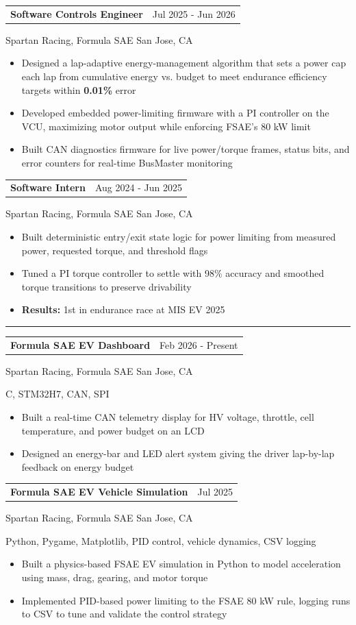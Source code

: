 \documentclass[10pt,letterpaper]{article}
\makeatletter
\newcommand{\sectionheader}[1]{%
  \vspace{4pt}
  \noindent\rule{\textwidth}{0.35pt}\par
  \vspace{4pt}
  \noindent{\fontsize{12.5}{13.5}\selectfont\textbf{#1}}\par
  \vspace{3pt}
}
\newcommand{\roleline}[2]{%
  \noindent
  \begin{tabular*}{\textwidth}{@{\extracolsep{\fill}} l r}
    \textbf{#1} & #2 \\
  \end{tabular*}
  \vspace{-2pt}
}
\newcommand{\orgline}[1]{%
  #1\par
  \vspace{1pt}
}
\newcommand{\techline}[1]{%
  #1\par
  \vspace{1pt}
}
\newcommand{\entryspace}{\vspace{2pt}}
\makeatother
\begin{document}
\roleline{Software Controls Engineer}{Jul 2025 - Jun 2026}
\orgline{Spartan Racing, Formula SAE\textbar{} San Jose, CA}
\begin{itemize}
  \item Designed a lap-adaptive energy-management algorithm that sets a power cap each lap from cumulative energy vs. budget to meet endurance efficiency targets within \textbf{0.01\%} error
  \item Developed embedded power-limiting firmware with a PI controller on the VCU, maximizing motor output while enforcing FSAE's 80 kW limit
  \item Built CAN diagnostics firmware for live power/torque frames, status bits, and error counters for real-time BusMaster monitoring
\end{itemize}

\entryspace

\roleline{Software Intern}{Aug 2024 - Jun 2025}
\orgline{Spartan Racing, Formula SAE\textbar{} San Jose, CA}
\begin{itemize}
  \item Built deterministic entry/exit state logic for power limiting from measured power, requested torque, and threshold flags
  \item Tuned a PI torque controller to settle with 98\% accuracy and smoothed torque transitions to preserve drivability
  \item \textbf{Results:} 1st in endurance race at MIS EV 2025
\end{itemize}

\sectionheader{PROJECT EXPERIENCE}

\roleline{Formula SAE EV Dashboard}{Feb 2026 - Present}
\orgline{Spartan Racing, Formula SAE\textbar{} San Jose, CA}
\techline{C, STM32H7, CAN, SPI}
\begin{itemize}
  \item Built a real-time CAN telemetry display for HV voltage, throttle, cell temperature, and power budget on an LCD
  \item Designed an energy-bar and LED alert system giving the driver lap-by-lap feedback on energy budget
\end{itemize}

\entryspace

\roleline{Formula SAE EV Vehicle Simulation}{Jul 2025}
\orgline{Spartan Racing, Formula SAE\textbar{} San Jose, CA}
\techline{Python, Pygame, Matplotlib, PID control, vehicle dynamics, CSV logging}
\begin{itemize}
  \item Built a physics-based FSAE EV simulation in Python to model acceleration using mass, drag, gearing, and motor torque
  \item Implemented PID-based power limiting to the FSAE 80 kW rule, logging runs to CSV to tune and validate the control strategy
\end{itemize}
\end{document}
